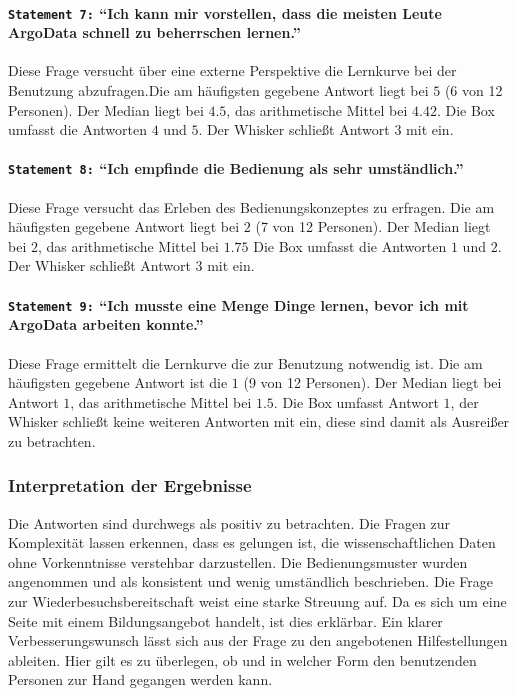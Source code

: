\paragraph{\texttt{Statement 7:} "`Ich kann mir vorstellen, dass die meisten Leute ArgoData schnell zu beherrschen lernen."'}
    Diese Frage versucht über eine externe Perspektive die Lernkurve bei der Benutzung abzufragen.Die am häufigsten gegebene Antwort liegt bei $5$ (6 von 12 Personen). Der Median liegt bei $4.5$, das arithmetische Mittel bei $4.42$. Die Box umfasst die Antworten $4$ und $5$. Der Whisker schließt Antwort $3$ mit ein.

\paragraph{\texttt{Statement 8:} "`Ich empfinde die Bedienung als sehr umständlich."'}
    Diese Frage versucht das Erleben des Bedienungskonzeptes zu erfragen. Die am häufigsten gegebene Antwort liegt bei $2$ (7 von 12 Personen). Der Median liegt bei $2$, das arithmetische Mittel bei $1.75$ Die Box umfasst die Antworten $1$ und $2$. Der Whisker schließt Antwort $3$ mit ein.

\paragraph{\texttt{Statement 9:} "`Ich musste eine Menge Dinge lernen, bevor ich mit ArgoData arbeiten konnte."'}
    Diese Frage ermittelt die Lernkurve die zur Benutzung notwendig ist. Die am häufigsten gegebene Antwort ist die $1$ (9 von 12 Personen). Der Median liegt bei Antwort $1$, das arithmetische Mittel bei $1.5$. Die Box umfasst Antwort $1$, der Whisker schließt keine weiteren Antworten mit ein, diese sind damit als Ausreißer zu betrachten.

\subsubsection{Interpretation der Ergebnisse}
Die Antworten sind durchwegs als positiv zu betrachten. Die Fragen zur Komplexität lassen erkennen, dass es gelungen ist, die wissenschaftlichen Daten ohne Vorkenntnisse verstehbar darzustellen. Die Bedienungsmuster wurden angenommen und als konsistent und wenig umständlich beschrieben. Die Frage zur Wiederbesuchsbereitschaft weist eine starke Streuung auf. Da es sich um eine Seite mit einem Bildungsangebot handelt, ist dies erklärbar.
Ein klarer Verbesserungswunsch lässt sich aus der Frage zu den angebotenen Hilfestellungen ableiten. Hier gilt es  zu überlegen, ob und in welcher Form den benutzenden Personen zur Hand gegangen werden kann.



